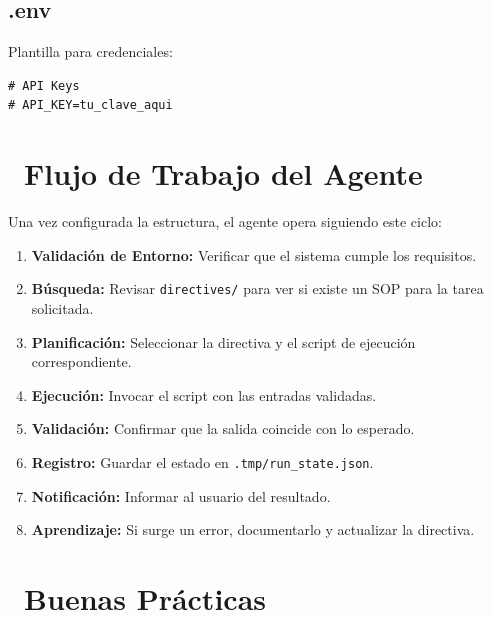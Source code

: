 \documentclass[11pt,a4paper]{article}
\newcommand{\iconotexto}[2]{\textcolor{cyanNeon}{\faIcon{#1}}~#2}
\begin{document}
\subsection{.env}
Plantilla para credenciales:

\begin{tcolorbox}[cajaContenido, title={\texttt{.env}}]
\begin{lstlisting}
# API Keys
# API_KEY=tu_clave_aqui
\end{lstlisting}
\end{tcolorbox}

\section[Flujo de Trabajo del Agente]{\iconotexto{sync-alt}{Flujo de Trabajo del Agente}}

Una vez configurada la estructura, el agente opera siguiendo este ciclo:

\begin{tcolorbox}[tarjetaDato, title={Ciclo de operación}]
\begin{enumerate}[leftmargin=*]
    \item \textbf{Validación de Entorno:} Verificar que el sistema cumple los requisitos.
    \item \textbf{Búsqueda:} Revisar \texttt{directives/} para ver si existe un SOP para la tarea solicitada.
    \item \textbf{Planificación:} Seleccionar la directiva y el script de ejecución correspondiente.
    \item \textbf{Ejecución:} Invocar el script con las entradas validadas.
    \item \textbf{Validación:} Confirmar que la salida coincide con lo esperado.
    \item \textbf{Registro:} Guardar el estado en \texttt{.tmp/run\_state.json}.
    \item \textbf{Notificación:} Informar al usuario del resultado.
    \item \textbf{Aprendizaje:} Si surge un error, documentarlo y actualizar la directiva.
\end{enumerate}
\end{tcolorbox}

\section[Buenas Prácticas]{\iconotexto{check-circle}{Buenas Prácticas}}
\end{document}
